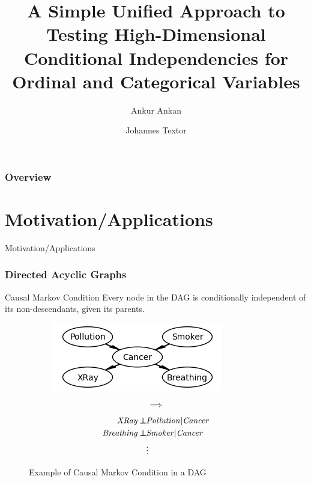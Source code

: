 \documentclass{beamer}
\def\ci{\perp\!\!\!\!\!\perp}
\begin{document}
\title[Unified CI test for Ordinal and Categorical Variables]{A Simple Unified Approach to Testing High-Dimensional Conditional Independencies for Ordinal and Categorical Variables}
\author {Ankur Ankan \and Johannes Textor}
\date{}
\maketitle

\begin{frame}
	\frametitle{Overview}
	\tableofcontents
\end{frame}

\section{Motivation/Applications}
\begin{frame}
	\begin{center} \Huge{Motivation/Applications} \end{center}
\end{frame}
\begin{frame}
	\frametitle{Directed Acyclic Graphs}
	\begin{block}{Causal Markov Condition}
		Every node in the DAG is conditionally independent of its non-descendants, given its parents.
	\end{block}
	\vspace{2em}
	\begin{figure}
		\begin{subfigure}{0.45\textwidth}
			\centering
			\includegraphics[scale=0.6]{imgs/example_dag.png}
		\end{subfigure}%
		\begin{subfigure}{0.1\textwidth}
			$$ \implies $$
		\end{subfigure}%
		\begin{subfigure}{0.45\textwidth}
			\begin{equation*}
				\begin{split}
					\text{\emph{XRay}} \ci & \text{\emph{Pollution}} | \text{\emph{Cancer}} \\
					\text{\emph{Breathing}} \ci & \text{\emph{Smoker}} | \text{\emph{Cancer}} \\
					& \vdots \\
				\end{split}
			\end{equation*}
		\end{subfigure}
		\caption*{Example of Causal Markov Condition in a DAG \footnotemark}
	\end{figure}
\end{frame}
\end{document}
